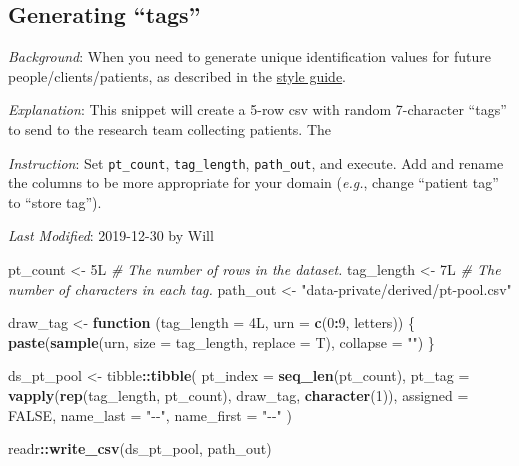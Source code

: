\documentclass[
]{book}
\newenvironment{Shaded}{\begin{snugshade}}{\end{snugshade}}
\newcommand{\CommentTok}[1]{\textcolor[rgb]{0.56,0.35,0.01}{\textit{#1}}}
\newcommand{\ControlFlowTok}[1]{\textcolor[rgb]{0.13,0.29,0.53}{\textbf{#1}}}
\newcommand{\DataTypeTok}[1]{\textcolor[rgb]{0.13,0.29,0.53}{#1}}
\newcommand{\DecValTok}[1]{\textcolor[rgb]{0.00,0.00,0.81}{#1}}
\newcommand{\KeywordTok}[1]{\textcolor[rgb]{0.13,0.29,0.53}{\textbf{#1}}}
\newcommand{\NormalTok}[1]{#1}
\newcommand{\OperatorTok}[1]{\textcolor[rgb]{0.81,0.36,0.00}{\textbf{#1}}}
\newcommand{\OtherTok}[1]{\textcolor[rgb]{0.56,0.35,0.01}{#1}}
\newcommand{\StringTok}[1]{\textcolor[rgb]{0.31,0.60,0.02}{#1}}
\begin{document}
\hypertarget{snippets-identification-tags}{%
\subsection{Generating ``tags''}\label{snippets-identification-tags}}

\emph{Background}: When you need to generate unique identification values for future people/clients/patients, as described in the \protect\hyperlink{style-number}{style guide}.

\emph{Explanation}: This snippet will create a 5-row csv with random 7-character ``tags'' to send to the research team collecting patients. The

\emph{Instruction}: Set \texttt{pt\_count}, \texttt{tag\_length}, \texttt{path\_out}, and execute. Add and rename the columns to be more appropriate for your domain (\emph{e.g.}, change ``patient tag'' to ``store tag'').

\emph{Last Modified}: 2019-12-30 by Will

\begin{Shaded}
\begin{Highlighting}[]
\NormalTok{pt\_count    \textless{}{-}}\StringTok{ }\NormalTok{5L   }\CommentTok{\# The number of rows in the dataset.}
\NormalTok{tag\_length  \textless{}{-}}\StringTok{ }\NormalTok{7L   }\CommentTok{\# The number of characters in each tag.}
\NormalTok{path\_out    \textless{}{-}}\StringTok{ "data{-}private/derived/pt{-}pool.csv"}

\NormalTok{draw\_tag \textless{}{-}}\StringTok{ }\ControlFlowTok{function}\NormalTok{ (}\DataTypeTok{tag\_length =}\NormalTok{ 4L, }\DataTypeTok{urn =} \KeywordTok{c}\NormalTok{(}\DecValTok{0}\OperatorTok{:}\DecValTok{9}\NormalTok{, letters)) \{}
  \KeywordTok{paste}\NormalTok{(}\KeywordTok{sample}\NormalTok{(urn, }\DataTypeTok{size =}\NormalTok{ tag\_length, }\DataTypeTok{replace =}\NormalTok{ T), }\DataTypeTok{collapse =} \StringTok{""}\NormalTok{)}
\NormalTok{\}}

\NormalTok{ds\_pt\_pool \textless{}{-}}
\StringTok{  }\NormalTok{tibble}\OperatorTok{::}\KeywordTok{tibble}\NormalTok{(}
    \DataTypeTok{pt\_index    =} \KeywordTok{seq\_len}\NormalTok{(pt\_count),}
    \DataTypeTok{pt\_tag      =} \KeywordTok{vapply}\NormalTok{(}\KeywordTok{rep}\NormalTok{(tag\_length, pt\_count), draw\_tag, }\KeywordTok{character}\NormalTok{(}\DecValTok{1}\NormalTok{)),}
    \DataTypeTok{assigned    =} \OtherTok{FALSE}\NormalTok{,}
    \DataTypeTok{name\_last   =} \StringTok{"{-}{-}"}\NormalTok{,}
    \DataTypeTok{name\_first  =} \StringTok{"{-}{-}"}
\NormalTok{  )}

\NormalTok{readr}\OperatorTok{::}\KeywordTok{write\_csv}\NormalTok{(ds\_pt\_pool, path\_out)}
\end{Highlighting}
\end{Shaded}
\end{document}
